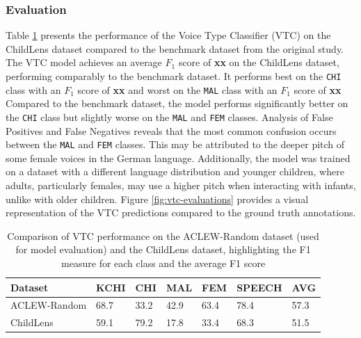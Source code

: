 \documentclass[
  man,floatsintext]{apa6}
\begin{document}
\subsubsection{Evaluation}\label{evaluation-1}

Table \ref{tab:vtc-results} presents the performance of the Voice Type Classifier (VTC) on the ChildLens dataset compared to the benchmark dataset from the original study. The VTC model achieves an average \(F_1\) score of \textbf{xx} on the ChildLens dataset, performing comparably to the benchmark dataset. It performs best on the \texttt{CHI} class with an \(F_1\) score of \textbf{xx} and worst on the \texttt{MAL} class with an \(F_1\) score of \textbf{xx} Compared to the benchmark dataset, the model performs significantly better on the \texttt{CHI} class but slightly worse on the \texttt{MAL} and \texttt{FEM} classes. Analysis of False Positives and False Negatives reveals that the most common confusion occurs between the \texttt{MAL} and \texttt{FEM} classes. This may be attributed to the deeper pitch of some female voices in the German language. Additionally, the model was trained on a dataset with a different language distribution and younger children, where adults, particularly females, may use a higher pitch when interacting with infants, unlike with older children.
Figure \ref{fig:vtc-evaluations} provides a visual representation of the VTC predictions compared to the ground truth annotations.

\begin{table}[tbp]

\begin{center}
\begin{threeparttable}

\caption{\label{tab:vtc-results}Comparison of VTC performance on the ACLEW-Random dataset (used for model evaluation) and the ChildLens dataset, highlighting the F1  measure for each class and the average F1 score}

\begin{tabular}{lllllll}
\toprule
Dataset & \multicolumn{1}{c}{KCHI} & \multicolumn{1}{c}{CHI} & \multicolumn{1}{c}{MAL} & \multicolumn{1}{c}{FEM} & \multicolumn{1}{c}{SPEECH} & \multicolumn{1}{c}{AVG}\\
\midrule
ACLEW-Random & 68.7 & 33.2 & 42.9 & 63.4 & 78.4 & 57.3\\
ChildLens & 59.1 & 79.2 & 17.8 & 33.4 & 68.3 & 51.5\\
\bottomrule
\end{tabular}

\end{threeparttable}
\end{center}

\end{table}
\end{document}
